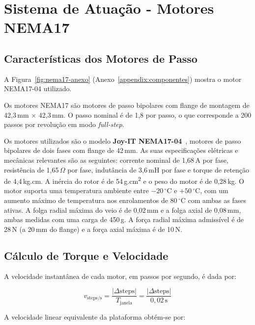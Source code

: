 \section{Sistema de Atuação - Motores NEMA17}
\label{sec:sistema-atuacao}

\subsection{Características dos Motores de Passo}
\label{subsec:caracteristicas-motores}

A Figura~\ref{fig:nema17-anexo} (Anexo~\ref{appendix:componentes}) mostra o motor NEMA17-04 utilizado.

Os motores NEMA17 são motores de passo bipolares com flange de montagem de 42,3\,mm $\times$ 42,3\,mm. O passo nominal é de 1{,}8\textdegree{} por passo, o que corresponde a 200 passos por revolução em modo \textit{full-step}.

Os motores utilizados são o modelo \textbf{Joy-IT NEMA17-04}~\cite{JoyITNEMA17}, motores de passo bipolares de dois fases com flange de 42\,mm. As suas especificações elétricas e mecânicas relevantes são as seguintes: corrente nominal de 1,68\,A por fase, resistência de 1,65\,$\Omega$ por fase, indutância de 3,6\,mH por fase e torque de retenção de 4,4\,kg.cm. A inércia do rotor é de 54\,g.cm\textsuperscript{2} e o peso do motor é de 0,28\,kg. O motor suporta uma temperatura ambiente entre $-20\,^\circ$C e $+50\,^\circ$C, com um aumento máximo de temperatura nos enrolamentos de $80\,^\circ$C com ambas as fases ativas. A folga radial máxima do veio é de 0,02\,mm e a folga axial de 0,08\,mm, ambas medidas com uma carga de 450\,g. A força radial máxima admissível é de 28\,N (a 20\,mm do flange) e a força axial máxima é de 10\,N.



\subsection{Cálculo de Torque e Velocidade}
\label{subsec:calculo-torque}

A velocidade instantânea de cada motor, em passos por segundo, é dada por:

\begin{equation}
v_{\text{steps/s}} = \frac{|\Delta\text{steps}|}{T_{\text{janela}}} = \frac{|\Delta\text{steps}|}{0{,}02\,\text{s}}
\label{eq:velocidade-motor}
\end{equation}

A velocidade linear equivalente da plataforma obtém-se por:

